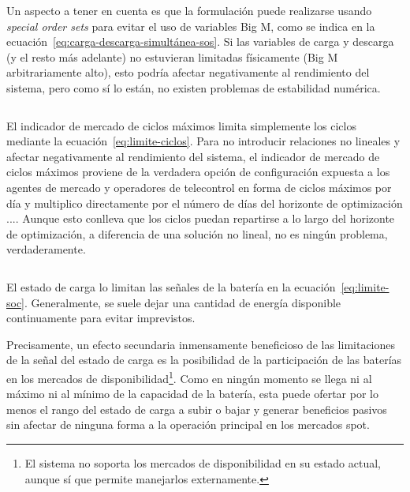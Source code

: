 \begin{equation}
  \label{eq:carga-descarga-simultánea}
\end{equation}

Un aspecto a tener en cuenta es que la formulación puede realizarse usando \textit{special order sets} para evitar el uso de variables Big M, como se indica en la ecuación~\ref{eq:carga-descarga-simultánea-sos}. Si las variables de carga y descarga (y el resto más adelante) no estuvieran limitadas físicamente (Big M arbitrariamente alto), esto podría afectar negativamente al rendimiento del sistema, pero como sí lo están, no existen problemas de estabilidad numérica.

\begin{equation}
  \label{eq:carga-descarga-simultánea-sos}
\end{equation}

El indicador de mercado de ciclos máximos limita simplemente los ciclos mediante la ecuación~\ref{eq:limite-ciclos}. Para no introducir relaciones no lineales y afectar negativamente al rendimiento del sistema, el indicador de mercado de ciclos máximos proviene de la verdadera opción de configuración expuesta a los agentes de mercado y operadores de telecontrol en forma de ciclos máximos por día y multiplico directamente por el número de días del horizonte de optimización \( ... \). Aunque esto conlleva que los ciclos puedan repartirse a lo largo del horizonte de optimización, a diferencia de una solución no lineal, no es ningún problema, verdaderamente.

\begin{equation}
  \label{eq:limite-ciclos}
\end{equation}

El estado de carga lo limitan las señales de la batería en la ecuación~\ref{eq:limite-soc}. Generalmente, se suele dejar una cantidad de energía disponible continuamente para evitar imprevistos.

Precisamente, un efecto secundaria inmensamente beneficioso de las limitaciones de la señal del estado de carga es la posibilidad de la participación de las baterías en los mercados de disponibilidad\footnote{El sistema no soporta los mercados de disponibilidad en su estado actual, aunque sí que permite manejarlos externamente.}. Como en ningún momento se llega ni al máximo ni al mínimo de la capacidad de la batería, esta puede ofertar por lo menos el rango del estado de carga a subir o bajar y generar beneficios pasivos sin afectar de ninguna forma a la operación principal en los mercados spot.

